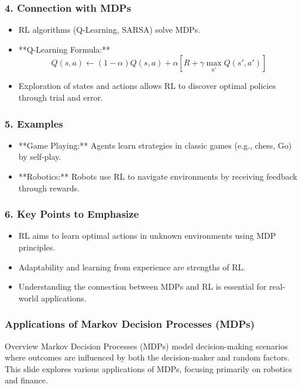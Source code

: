 \documentclass[aspectratio=169]{beamer}
\begin{document}
\begin{frame}[fragile]
    \frametitle{4. Connection with MDPs}
    \begin{itemize}
        \item RL algorithms (Q-Learning, SARSA) solve MDPs.
        \item **Q-Learning Formula:** 
        \begin{equation}
        Q(s, a) \gets (1 - \alpha) Q(s, a) + \alpha [R + \gamma \max_{a'} Q(s', a')]
        \end{equation}
        \item Exploration of states and actions allows RL to discover optimal policies through trial and error.
    \end{itemize}
\end{frame}

\begin{frame}[fragile]
    \frametitle{5. Examples}
    \begin{itemize}
        \item **Game Playing:** Agents learn strategies in classic games (e.g., chess, Go) by self-play.
        \item **Robotics:** Robots use RL to navigate environments by receiving feedback through rewards.
    \end{itemize}
\end{frame}

\begin{frame}[fragile]
    \frametitle{6. Key Points to Emphasize}
    \begin{itemize}
        \item RL aims to learn optimal actions in unknown environments using MDP principles.
        \item Adaptability and learning from experience are strengths of RL.
        \item Understanding the connection between MDPs and RL is essential for real-world applications.
    \end{itemize}
\end{frame}

\begin{frame}[fragile]
  \frametitle{Applications of Markov Decision Processes (MDPs)}
  \begin{block}{Overview}
    Markov Decision Processes (MDPs) model decision-making scenarios where outcomes are influenced by both the decision-maker and random factors. This slide explores various applications of MDPs, focusing primarily on robotics and finance.
  \end{block}
\end{frame}
\end{document}
